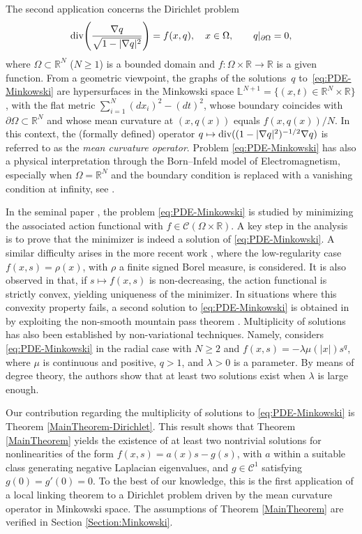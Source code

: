 \documentclass{article}
\newcommand{\boC}{\mathcal{C}}
\newcommand{\R}{\mathbb{R}}
\DeclareMathOperator{\dv}{\hbox{div}}
\theoremstyle{definition}
\begin{document}
The second application concerns the Dirichlet problem
\begin{equation}\label{eq:PDE-Minkowski}
  \dv\!\left(\frac{\nabla q}{\sqrt{1-|\nabla q|^2}}\right)=f(x,q),
  \quad x\in\Omega,
  \qquad
  q|_{\partial\Omega}=0,
\end{equation}
where $\Omega\subset\mathbb{R}^N$ ($N\geq 1$) is a bounded domain and $f\colon\Omega\times\mathbb{R}\to\mathbb{R}$ is a given function. From a geometric viewpoint, the graphs of the solutions~$q$
to~\eqref{eq:PDE-Minkowski} are hypersurfaces in the Minkowski space $\mathbb{L}^{N+1}=\{(x,t)\in\R^N\times \R\}$, with the flat metric $\sum_{i=1}^N(dx_i)^2-(dt)^2$, whose
boundary coincides with $\partial\Omega\subset\mathbb{R}^N$ and whose mean
curvature at $(x,q(x))$ equals $f(x,q(x))/N$. In this context, the (formally defined) operator $q\mapsto\dv ((1-|\nabla q|^2)^{-1/2}\nabla q)$ is referred to as the \emph{mean curvature operator}. Problem \eqref{eq:PDE-Minkowski} has also a physical interpretation through the Born--Infeld model of Electromagnetism, especially when $\Omega=\R^N$ and the boundary condition is replaced with a vanishing condition at infinity, see \cite{BonDavPom,ByeIkoMalMar1}.

In the seminal paper \cite{BS}, the problem \eqref{eq:PDE-Minkowski} is studied by minimizing the associated action functional with $f\in\boC(\Omega\times\R)$. A key step in the analysis is to prove that the minimizer is indeed a solution of \eqref{eq:PDE-Minkowski}. A similar difficulty arises in the more recent work \cite{ByeIkoMalMar2}, where the low-regularity case $f(x,s)=\rho(x)$, with $\rho$ a finite signed Borel measure, is considered. It is also observed in \cite{BS} that, if $s\mapsto f(x,s)$ is non-decreasing, the action functional is strictly convex, yielding uniqueness of the minimizer. In situations where this convexity property fails, a second solution to \eqref{eq:PDE-Minkowski} is obtained in \cite{BerJebMaw} by exploiting the non-smooth mountain pass theorem \cite[Theorem 3.2]{Szu}. Multiplicity of solutions has also been established by non-variational techniques. Namely, \cite{BerJebTor} considers \eqref{eq:PDE-Minkowski} in the radial case with $N\ge2$ and $f(x,s)=-\lambda\mu(|x|)s^q$, where $\mu$ is continuous and positive, $q>1$, and $\lambda>0$ is a parameter. By means of degree theory, the authors show that at least two solutions exist when $\lambda$ is large enough.

Our contribution regarding the multiplicity of solutions to \eqref{eq:PDE-Minkowski} is Theorem \ref{MainTheorem-Dirichlet}. This result shows that Theorem \ref{MainTheorem} yields the existence of at least two nontrivial solutions for nonlinearities of the form $f(x,s)=a(x)s-g(s)$, with $a$ within a suitable class generating negative Laplacian eigenvalues, and $g\in\boC^1$ satisfying $g(0)=g'(0)=0$. To the best of our knowledge, this is the first application of a local linking theorem to a Dirichlet problem driven by the mean curvature operator in Minkowski space. The assumptions of Theorem \ref{MainTheorem} are verified in Section \ref{Section:Minkowski}.
\end{document}
